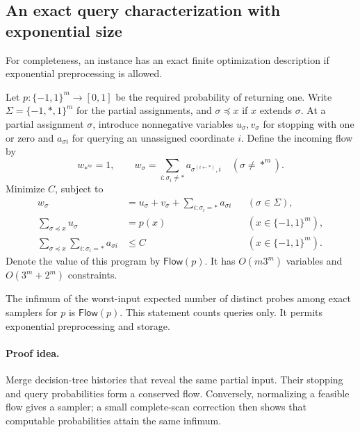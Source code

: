 \subsection{An exact query characterization with exponential size}
\label{sec:query-flow-lp}

For completeness, an instance has an exact finite optimization
description if exponential preprocessing is allowed.

Let \(p:\{-1,1\}^m\to[0,1]\) be the required probability of
returning one.  Write \(\Sigma=\{-1,*,1\}^m\) for the partial
assignments, and \(\sigma\preceq x\) if \(x\) extends
\(\sigma\).  At a partial assignment \(\sigma\), introduce
nonnegative variables \(u_\sigma,v_\sigma\) for stopping with
one or zero and \(a_{\sigma i}\) for querying an unassigned
coordinate \(i\).  Define the incoming flow by
\[
 w_{*^m}=1,\qquad
 w_\sigma=
 \sum_{i:\sigma_i\ne *}a_{\sigma^{(i\leftarrow *)},i}
 \quad(\sigma\ne *^m).
\]
Minimize \(C\), subject to
\begin{align*}
 w_\sigma&=u_\sigma+v_\sigma+
                 \sum_{i:\sigma_i=*}a_{\sigma i}
 &&(\sigma\in\Sigma),\\
 \sum_{\sigma\preceq x}u_\sigma&=p(x)
 &&(x\in\{-1,1\}^m),\\
 \sum_{\sigma\preceq x}\sum_{i:\sigma_i=*}a_{\sigma i}
 &\le C
 &&(x\in\{-1,1\}^m).
\end{align*}
Denote the value of this program by \(\mathsf{Flow}(p)\).
It has \(O(m3^m)\) variables and \(O(3^m+2^m)\) constraints.

\begin{lemma}\label{lem:instanceflow}
The infimum of the worst-input expected number of distinct probes
among exact samplers for \(p\) is \(\mathsf{Flow}(p)\).
This statement counts queries only.  It permits exponential
preprocessing and storage.
\end{lemma}

\paragraph{Proof idea.}
Merge decision-tree histories that reveal the same partial input.
Their stopping and query probabilities form a conserved flow. Conversely,
normalizing a feasible flow gives a sampler; a small complete-scan correction
then shows that computable probabilities attain the same infimum.

